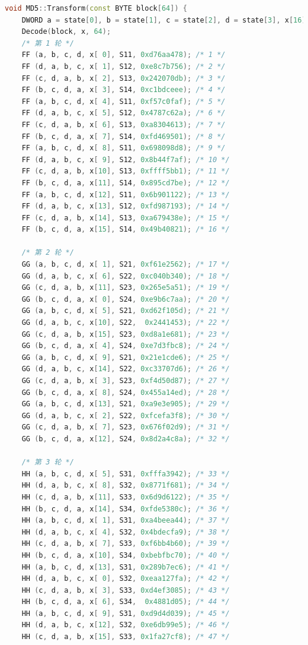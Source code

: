 \documentclass[UTF8,a4paper,10pt]{ctexart}
\begin{document}
\begin{itemize}
    \begin{lstlisting}[language = C++]
void MD5::Transform(const BYTE block[64]) {
    DWORD a = state[0], b = state[1], c = state[2], d = state[3], x[16];
    Decode(block, x, 64);
    /* 第 1 轮 */
    FF (a, b, c, d, x[ 0], S11, 0xd76aa478); /* 1 */
	FF (d, a, b, c, x[ 1], S12, 0xe8c7b756); /* 2 */
	FF (c, d, a, b, x[ 2], S13, 0x242070db); /* 3 */
	FF (b, c, d, a, x[ 3], S14, 0xc1bdceee); /* 4 */
	FF (a, b, c, d, x[ 4], S11, 0xf57c0faf); /* 5 */
	FF (d, a, b, c, x[ 5], S12, 0x4787c62a); /* 6 */
	FF (c, d, a, b, x[ 6], S13, 0xa8304613); /* 7 */
	FF (b, c, d, a, x[ 7], S14, 0xfd469501); /* 8 */
	FF (a, b, c, d, x[ 8], S11, 0x698098d8); /* 9 */
	FF (d, a, b, c, x[ 9], S12, 0x8b44f7af); /* 10 */
	FF (c, d, a, b, x[10], S13, 0xffff5bb1); /* 11 */
	FF (b, c, d, a, x[11], S14, 0x895cd7be); /* 12 */
	FF (a, b, c, d, x[12], S11, 0x6b901122); /* 13 */
	FF (d, a, b, c, x[13], S12, 0xfd987193); /* 14 */
	FF (c, d, a, b, x[14], S13, 0xa679438e); /* 15 */
	FF (b, c, d, a, x[15], S14, 0x49b40821); /* 16 */

	/* 第 2 轮 */
	GG (a, b, c, d, x[ 1], S21, 0xf61e2562); /* 17 */
	GG (d, a, b, c, x[ 6], S22, 0xc040b340); /* 18 */
	GG (c, d, a, b, x[11], S23, 0x265e5a51); /* 19 */
	GG (b, c, d, a, x[ 0], S24, 0xe9b6c7aa); /* 20 */
	GG (a, b, c, d, x[ 5], S21, 0xd62f105d); /* 21 */
	GG (d, a, b, c, x[10], S22,  0x2441453); /* 22 */
	GG (c, d, a, b, x[15], S23, 0xd8a1e681); /* 23 */
	GG (b, c, d, a, x[ 4], S24, 0xe7d3fbc8); /* 24 */
	GG (a, b, c, d, x[ 9], S21, 0x21e1cde6); /* 25 */
	GG (d, a, b, c, x[14], S22, 0xc33707d6); /* 26 */
	GG (c, d, a, b, x[ 3], S23, 0xf4d50d87); /* 27 */
	GG (b, c, d, a, x[ 8], S24, 0x455a14ed); /* 28 */
	GG (a, b, c, d, x[13], S21, 0xa9e3e905); /* 29 */
	GG (d, a, b, c, x[ 2], S22, 0xfcefa3f8); /* 30 */
	GG (c, d, a, b, x[ 7], S23, 0x676f02d9); /* 31 */
	GG (b, c, d, a, x[12], S24, 0x8d2a4c8a); /* 32 */

	/* 第 3 轮 */
	HH (a, b, c, d, x[ 5], S31, 0xfffa3942); /* 33 */
	HH (d, a, b, c, x[ 8], S32, 0x8771f681); /* 34 */
	HH (c, d, a, b, x[11], S33, 0x6d9d6122); /* 35 */
	HH (b, c, d, a, x[14], S34, 0xfde5380c); /* 36 */
	HH (a, b, c, d, x[ 1], S31, 0xa4beea44); /* 37 */
	HH (d, a, b, c, x[ 4], S32, 0x4bdecfa9); /* 38 */
	HH (c, d, a, b, x[ 7], S33, 0xf6bb4b60); /* 39 */
	HH (b, c, d, a, x[10], S34, 0xbebfbc70); /* 40 */
	HH (a, b, c, d, x[13], S31, 0x289b7ec6); /* 41 */
	HH (d, a, b, c, x[ 0], S32, 0xeaa127fa); /* 42 */
	HH (c, d, a, b, x[ 3], S33, 0xd4ef3085); /* 43 */
	HH (b, c, d, a, x[ 6], S34,  0x4881d05); /* 44 */
	HH (a, b, c, d, x[ 9], S31, 0xd9d4d039); /* 45 */
	HH (d, a, b, c, x[12], S32, 0xe6db99e5); /* 46 */
	HH (c, d, a, b, x[15], S33, 0x1fa27cf8); /* 47 */


\end{lstlisting}
\end{itemize}
\end{document}
